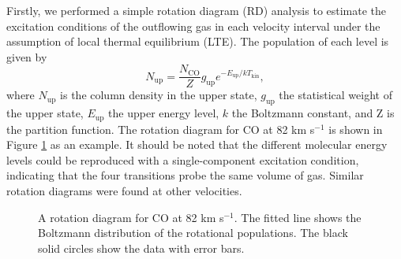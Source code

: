 Firstly, we performed a simple rotation diagram (RD) analysis \citep{1999ApJ...517..209G} to estimate the excitation conditions of the outflowing gas in each velocity interval under the assumption of local thermal equilibrium (LTE). The population of each level is given by 
\begin{equation}
N_{\mathrm{up}} = \frac{N_\mathrm{CO}}{Z} g_\mathrm{up} e^{-E_\mathrm{up}/kT_\mathrm{kin}},
\end{equation}
where $N_\mathrm{up}$ is the column density in the upper state, $g_\mathrm{up}$ the statistical weight of the upper state, $E_\mathrm{up}$ the upper energy level, $k$ the Boltzmann constant, and Z is the partition function.
The rotation diagram for CO at 82 km s$^{-1}$ is shown in Figure \ref{fig3} as an example. It should be noted that the different molecular energy levels could be reproduced with a single-component excitation condition, indicating that the four transitions probe the same volume of gas. Similar rotation diagrams were found at other velocities. 

\begin{figure}[tbp]
\caption{A rotation diagram for CO at 82 km s$^{-1}$.  The fitted line shows the Boltzmann distribution of the rotational populations. The black solid circles show the data with error bars. \label{fig3}}
\end{figure}

